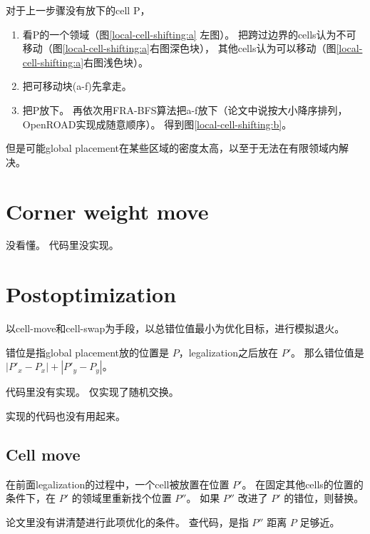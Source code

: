 \documentclass[UTF8,a4paper]{ctexart}
\begin{document}
对于上一步骤没有放下的cell P，
\begin{enumerate}
\item 看P的一个领域（图\ref{local-cell-shifting:a} 左图）。
    把跨过边界的cells认为不可移动（图\ref{local-cell-shifting:a}右图深色块），
    其他cells认为可以移动（图\ref{local-cell-shifting:a}右图浅色块）。
\item 把可移动块(a-f)先拿走。
\item 把P放下。
    再依次用FRA-BFS算法把a-f放下（论文中说按大小降序排列，OpenROAD实现成随意顺序）。
    得到图\ref{local-cell-shifting:b}。
\end{enumerate}
但是可能global placement在某些区域的密度太高，以至于无法在有限领域内解决。

\section{Corner weight move}

\begin{cautionblock}
    没看懂。
    代码里没实现。
\end{cautionblock}

\section{Postoptimization}

以cell-move和cell-swap为手段，以总错位值最小为优化目标，进行模拟退火。

\begin{noteblock}
    错位是指global placement放的位置是 $P$，legalization之后放在 $P'$。
    那么错位值是 $\left|P'_x-P_x\right| + \left|P'_y-P_y\right|$。
\end{noteblock}

\begin{noteblock}
    代码里没有实现。
    仅实现了随机交换。

    实现的代码也没有用起来。
\end{noteblock}

\subsection{Cell move}

在前面legalization的过程中，一个cell被放置在位置 $P'$。
在固定其他cells的位置的条件下，在 $P'$ 的领域里重新找个位置 $P''$。
如果 $P''$ 改进了 $P'$ 的错位，则替换。

\begin{noteblock}
    论文里没有讲清楚进行此项优化的条件。
    查代码，是指 $P''$ 距离 $P$ 足够近。
\end{noteblock}
\end{document}
